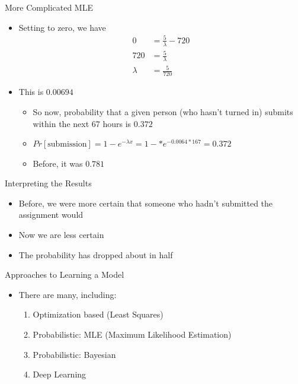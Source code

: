 \documentclass[aspectratio=169]{beamer}
\begin{document}
\begin{frame}{More Complicated MLE}

\begin{itemize}
	\item Setting to zero, we have
	\begin{align} 
			0 &= \frac{5}{\lambda} - 720 \nonumber \\
		 	720 &= \frac{5}{\lambda}  \nonumber \\
			\lambda &= \frac{5}{720} \nonumber
	\end{align}
	\item This is $0.00694$
	\begin{itemize}
	\item So now, probability that a given person (who hasn't turned in) submits within the next 67 hours is $0.372$
	\item $Pr[\textrm{submission}] = 1 - e^{-\lambda x} =1 -* e^{-0.0064 * 167} = 0.372$
	\item Before, it was $0.781$
	\end{itemize}
\end{itemize}
	\end{frame}

\begin{frame}{Interpreting the Results}
\begin{itemize}
	\item Before, we were more certain that someone who hadn't submitted the assignment would
	\item Now we are less certain
	\item The probability has dropped about in half 
	
\end{itemize}

\end{frame}

\begin{frame}{Approaches to Learning a Model}

\begin{itemize}
\item There are many, including:
\begin{enumerate}
\item Optimization based (Least Squares)
\item Probabilistic: MLE (Maximum Likelihood Estimation)
\item Probabilistic: Bayesian
\item Deep Learning
\end{enumerate}
\end{itemize}
\end{frame}
\end{document}
